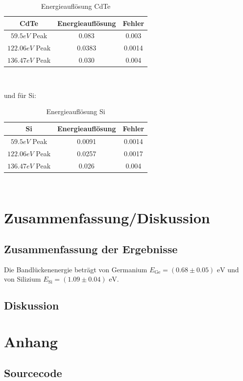 \documentclass[12pt]{article}
\begin{document}
\begin{table}[h!]

{\centering{}
\begin{tabular}{c||c|c}
	CdTe				& Energieauflösung & Fehler	\\ \hline\hline
$59.5 eV$ Peak		& 0.083		        & 0.003		\\ \hline
$122.06 eV$ Peak	& 0.0383		    & 0.0014	\\ \hline
$136.47 eV$ Peak	& 0.030	         	& 0.004
\end{tabular}\\}
 \caption{Energieauflösung CdTe}
\end{table}

und für Si:

\begin{table}[h!]

{\centering{}
\begin{tabular}{c||c|c}
	Si				& Energieauflösung & Fehler	\\ \hline\hline
$59.5 eV$ Peak		& 0.0091		    & 0.0014 	\\ \hline
$122.06 eV$ Peak	& 0.0257			& 0.0017	\\ \hline
$136.47 eV$ Peak	& 0.026		     	& 0.004
\end{tabular}\\}
 \caption{Energieauflösung Si}
\end{table}

\newpage
\section{Zusammenfassung/Diskussion}

\subsection{Zusammenfassung der Ergebnisse}
Die Bandlückenenergie beträgt von Germanium $E_{\text{Ge}}=(0.68\pm0.05)\text{ eV}$ und von Silizium $E_{\text{Si}}=(1.09\pm0.04)\text{ eV}$.

\subsection{Diskussion}\label{Diskussion}


\newpage
\section{Anhang}

\subsection{Sourcecode}
\end{document}
